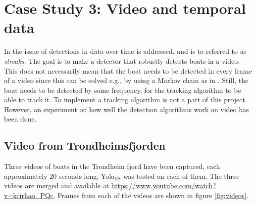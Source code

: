 \newpage

\section{Case Study 3: Video and temporal data}
In \citep{Bohn2018} the issue of detections in data over time is addressed, and is to referred to as \textit{streaks}. The goal is to make a detector that robustly detects boats in a video. This does not necessarily mean that the boat needs to be detected in every frame of a video since this can be solved e.g., by using a Markov chain as in \citep{Markov}. Still, the boat needs to be detected by some frequency, for the tracking algorithm to be able to track it. To implement a tracking algorithm is not a part of this project. However, an experiment on how well the detection algorithms work on video has been done. 

\subsection{Video from Trondheimsfjorden}

Three videos of boats in the Trondheim fjord have been captured, each approximately 20 seconds long. Yolo$_{\text{BS}}$ was tested on each of them. The three videos are merged and available at \url{https://www.youtube.com/watch?v=kcirhao_PQc}. Frames from each of the videos are shown in figure \ref{fig:videos}.

